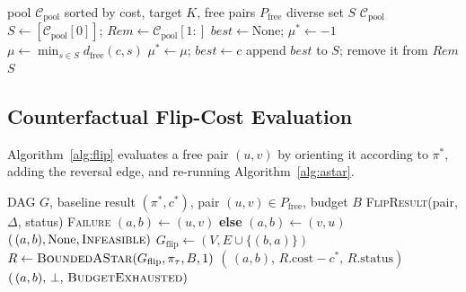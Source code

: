 \documentclass{ieeeaccess}
\newcommand{\Pfree}{P_{\mathrm{free}}}
\newcommand{\dfree}{d_{\mathrm{free}}}
\DeclareMathOperator{\pos}{pos}
\begin{document}
\begin{algorithm}[!t]
\caption{Diversity-Aware Farthest-First Selection}\label{alg:div}
\footnotesize
\begin{algorithmic}[1]
\Require pool $\mathcal{C}_{\mathrm{pool}}$ sorted by cost, target $K$, free pairs $\Pfree$
\Ensure diverse set $S$
 \Return $\mathcal{C}_{\mathrm{pool}}$
\EndIf
\State $S\gets[\mathcal{C}_{\mathrm{pool}}[0]]$; $\mathit{Rem}\gets\mathcal{C}_{\mathrm{pool}}[1{:}]$
  \State $\mathit{best}\gets\mathrm{None}$; $\mu^*\gets-1$
    \State $\mu\gets\min_{s\in S}\dfree(c,s)$
    \If{$\mu>\mu^*$} \State $\mu^*\gets\mu$; $\mathit{best}\gets c$
    \EndIf
  \EndFor
  \State append $\mathit{best}$ to $S$; remove it from $\mathit{Rem}$
\EndWhile
\State \Return $S$
\end{algorithmic}
\end{algorithm}

\subsection{Counterfactual Flip-Cost Evaluation}
Algorithm~\ref{alg:flip} evaluates a free pair $(u,v)$ by orienting it according to $\pi^*$, adding the reversal edge, and re-running Algorithm~\ref{alg:astar}.

\begin{algorithm}[!t]
\caption{Counterfactual Flip-Cost $\Delta_B(a,b)$}\label{alg:flip}
\footnotesize
\begin{algorithmic}[1]
\Require DAG $G$, baseline result $(\pi^*,c^*)$, pair $(u,v)\in\Pfree$, budget $B$
\Ensure \textsc{FlipResult}(pair, $\Delta$, status)
 \Return \textsc{Failure}
\EndIf
\If{$\pos_{\pi^*}(u)<\pos_{\pi^*}(v)$} $(a,b)\gets(u,v)$ \textbf{else} $(a,b)\gets(v,u)$
\EndIf
{} \Return $(\,(a,b),\mathrm{None},\textsc{Infeasible})$ 
\EndIf
\State $G_{\mathrm{flip}}\gets(V,E\cup\{(b,a)\})$
\State $R\gets\textsc{BoundedAStar}(G_{\mathrm{flip}},\pi_\tau,B,1)$
  \State \Return $(\,(a,b),\,R.\mathrm{cost}-c^*,\,R.\mathrm{status})$
\Else
  \State \Return $(\,(a,b),\,\bot,\,\textsc{BudgetExhausted})$
\EndIf
\end{algorithmic}
\end{algorithm}
\end{document}

